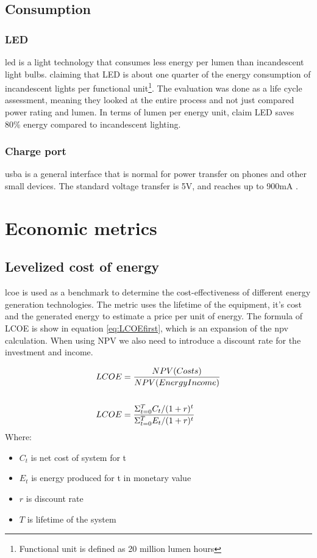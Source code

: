 \subsection{Consumption}

\subsubsection{LED}
\acrfull{led} is a light technology that consumes less energy per lumen than incandescent light bulbs. \citep{usdepartmentofenergyLifeCycleAssessmentEnergy2012} claiming that LED is about one quarter of the energy consumption of incandescent lights per functional unit\footnote{Functional unit is defined as 20 million lumen hours}. The evaluation was done as a life cycle assessment, meaning they looked at the entire process and not just compared power rating and lumen. In terms of lumen per energy unit, \citep{podeLightEmittingDiodes2011} claim LED saves 80\% energy compared to incandescent lighting. 

\subsubsection{Charge port}
\acrfull{usba} is a general interface that is normal for power transfer on phones and other small devices. The standard voltage transfer is 5V, and reaches up to 900mA \citep{jimmylinGettingBottomUSB2021}.

\section{Economic metrics}
\subsection{Levelized cost of energy}
\acrfull{lcoe} is used as a benchmark to determine the cost-effectiveness of different energy generation technologies\citep{brankerReviewSolarPhotovoltaic2011}. The metric uses the lifetime of the equipment, it's cost and the generated energy to estimate a price per unit of energy. The formula of LCOE is show in equation \eqref{eq:LCOEfirst}, which is an expansion of the \acrfull{npv} calculation. When using NPV we also need to introduce a discount rate for the investment and income.

\begin{align}
    LCOE & = \frac{NPV(Costs)}{NPV(EnergyIncome)} \notag \\
    \notag \\
    LCOE &= \frac{\Sigma_{t=0}^T  C_t/(1+r)^t}{\Sigma_{t=0}^T  E_t/(1+r)^t}
    \label{eq:LCOEfirst}
\end{align}
Where:
\begin{itemize}
    \item $C_t$ is net cost of system for t
    \item $E_t$ is energy produced for t in monetary value
    \item  $r$ is discount rate
    \item $T$ is lifetime of the system
\end{itemize}

